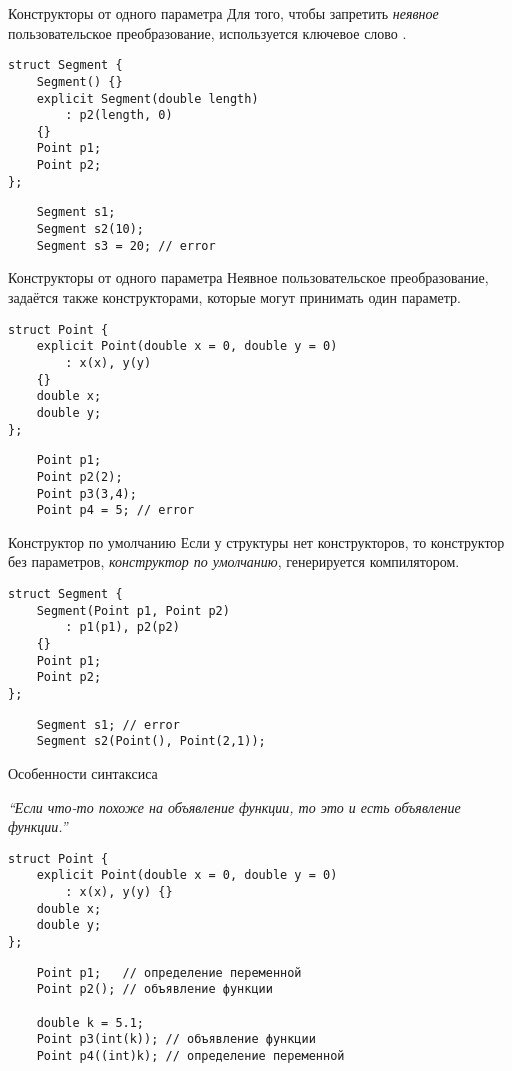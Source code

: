 \documentclass{beamer}
\begin{document}
\begin{frame}[fragile]{Конструкторы от одного параметра}
    Для того, чтобы запретить {\em неявное} пользовательское
преобразование, используется ключевое слово .
\begin{lstlisting}
struct Segment {
    Segment() {}
    explicit Segment(double length) 
        : p2(length, 0)
    {}
    Point p1;
    Point p2;
};
\end{lstlisting}
\begin{lstlisting}
    Segment s1;
    Segment s2(10);
    Segment s3 = 20; // error
\end{lstlisting}
\end{frame}

\begin{frame}[fragile]{Конструкторы от одного параметра}
Неявное пользовательское преобразование, 
задаётся также конструкторами, которые могут принимать один параметр.
\begin{lstlisting}
struct Point {
    explicit Point(double x = 0, double y = 0) 
        : x(x), y(y)
    {}
    double x;
    double y;
};
\end{lstlisting}
\begin{lstlisting}
    Point p1;
    Point p2(2);
    Point p3(3,4);
    Point p4 = 5; // error
\end{lstlisting}
\end{frame}

\begin{frame}[fragile]{Конструктор по умолчанию}
    Если у структуры нет конструкторов, то конструктор 
    без параметров, {\em конструктор по умолчанию},
    генерируется компилятором.
\begin{lstlisting}
struct Segment {
    Segment(Point p1, Point p2) 
        : p1(p1), p2(p2)
    {}
    Point p1;
    Point p2;
};
\end{lstlisting}
\begin{lstlisting}
    Segment s1; // error
    Segment s2(Point(), Point(2,1));
\end{lstlisting}
\end{frame}

\begin{frame}[fragile]{Особенности синтаксиса \langcpp}

    {\em ``Если что-то похоже на объявление функции, то это
    и есть объявление функции.''}
\begin{lstlisting}
struct Point {
    explicit Point(double x = 0, double y = 0) 
        : x(x), y(y) {}
    double x;
    double y;
};
\end{lstlisting}
\begin{lstlisting}
    Point p1;   // определение переменной
    Point p2(); // объявление функции

    double k = 5.1;
    Point p3(int(k)); // объявление функции
    Point p4((int)k); // определение переменной
\end{lstlisting}
\end{frame}
\end{document}

